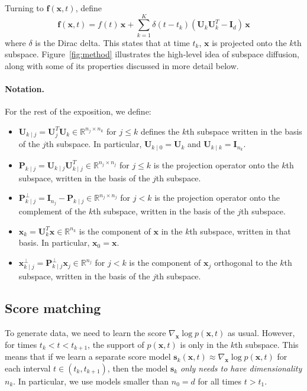 \documentclass{article}
\begin{document}
Turning to $\mathbf{f}(\mathbf{x}, t)$, define 
\begin{equation} \label{eq:f}
    \mathbf{f}(\mathbf{x}, t) = f(t)\,\mathbf{x} + \sum_{k=1}^K \delta(t-t_k)(\mathbf{U}_k\mathbf{U}_k^T - \mathbf{I}_d)\,\mathbf{x}
\end{equation}
where $\delta$ is the Dirac delta. This states that at time $t_k$, $\mathbf{x}$ is projected onto the $k$th subspace. Figure~\ref{fig:method} illustrates the high-level idea of subspace diffusion, along with some of its properties discussed in more detail below.

\paragraph{\textbf{Notation.}} For the rest of the exposition, we define:
\begin{itemize}
    \item $\mathbf{U}_{k \mid j} = \mathbf{U}_j^T\mathbf{U}_k \in \mathbb{R}^{n_j \times n_k}$ for $j \le k$ defines the $k$th subspace written in the basis of the $j$th subspace. In particular, $\mathbf{U}_{k \mid 0} = \mathbf{U}_k$ and $\mathbf{U}_{k \mid k} = \mathbf{I}_{n_k}$.
    \item $\mathbf{P}_{k \mid j} = \mathbf{U}_{k\mid j}\mathbf{U}_{k \mid j}^T \in \mathbb{R}^{n_j \times n_j}$ for $j \le k$ is the projection operator onto the $k$th subspace, written in the basis of the $j$th subspace.
    \item $\mathbf{P}_{k \mid j}^\perp = \mathbf{I}_{n_j} - \mathbf{P}_{k \mid j}  \in \mathbb{R}^{n_j \times n_j}$ for $j < k$ is the projection operator onto the complement of the $k$th subspace, written in the basis of the $j$th subspace.
    \item $\mathbf{x}_{k} = \mathbf{U}_k^T\mathbf{x} \in \mathbb{R}^{n_k}$ is the component of $\mathbf{x}$ in the $k$th subspace, written in that basis. In particular, $\mathbf{x}_0 = \mathbf{x}$.
    \item $\mathbf{x}^\perp_{k\mid j} = \mathbf{P}^\perp_{k\mid j}\mathbf{x}_j \in \mathbb{R}^{n_j}$ for $j < k$ is the component of $\mathbf{x}_j$ orthogonal to the $k$th subspace, written in the basis of the $j$th subspace.
\end{itemize}

\subsection{Score matching} \label{sec:score}
To generate data, we need to learn the score $\nabla_\mathbf{x} \log p(\mathbf{x}, t)$ as usual. However, for times $t_k < t < t_{k+1}$, the support of $p(\mathbf{x}, t)$ is only in the $k$th subspace. This means that if we learn a separate score model $\mathbf{s}_k(\mathbf{x}, t) \approx \nabla_\mathbf{x} \log p(\mathbf{x}, t)$ for each interval $t \in (t_k, t_{k+1})$, then the model $\mathbf{s}_k$ \emph{only needs to have dimensionality} $n_k$. In particular, we use models smaller than $n_0 = d$ for all times $t > t_1$.
\end{document}
